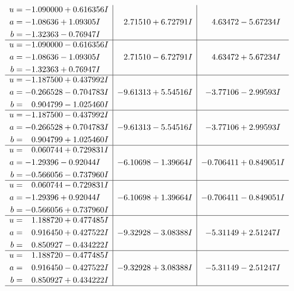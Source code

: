 \documentclass[1p]{elsarticle_modified}
\theoremstyle{definition}
\begin{document}
$$\begin{array}{c|c|c}
\begin{aligned}
u &= -1.090000 + 0.616356 I \\
a &= -1.08636 + 1.09305 I \\
b &= -1.32363 - 0.76947 I\end{aligned}
 & \phantom{-}2.71510 + 6.72791 I & \phantom{-}4.63472 - 5.67234 I \\ \hline\begin{aligned}
u &= -1.090000 - 0.616356 I \\
a &= -1.08636 - 1.09305 I \\
b &= -1.32363 + 0.76947 I\end{aligned}
 & \phantom{-}2.71510 - 6.72791 I & \phantom{-}4.63472 + 5.67234 I \\ \hline\begin{aligned}
u &= -1.187500 + 0.437992 I \\
a &= -0.266528 - 0.704783 I \\
b &= \phantom{-}0.904799 - 1.025460 I\end{aligned}
 & -9.61313 + 5.54516 I & -3.77106 - 2.99593 I \\ \hline\begin{aligned}
u &= -1.187500 - 0.437992 I \\
a &= -0.266528 + 0.704783 I \\
b &= \phantom{-}0.904799 + 1.025460 I\end{aligned}
 & -9.61313 - 5.54516 I & -3.77106 + 2.99593 I \\ \hline\begin{aligned}
u &= \phantom{-}0.060744 + 0.729831 I \\
a &= -1.29396 - 0.92044 I \\
b &= -0.566056 - 0.737960 I\end{aligned}
 & -6.10698 - 1.39664 I & -0.706411 + 0.849051 I \\ \hline\begin{aligned}
u &= \phantom{-}0.060744 - 0.729831 I \\
a &= -1.29396 + 0.92044 I \\
b &= -0.566056 + 0.737960 I\end{aligned}
 & -6.10698 + 1.39664 I & -0.706411 - 0.849051 I \\ \hline\begin{aligned}
u &= \phantom{-}1.188720 + 0.477485 I \\
a &= \phantom{-}0.916450 + 0.427522 I \\
b &= \phantom{-}0.850927 - 0.434222 I\end{aligned}
 & -9.32928 - 3.08388 I & -5.31149 + 2.51247 I \\ \hline\begin{aligned}
u &= \phantom{-}1.188720 - 0.477485 I \\
a &= \phantom{-}0.916450 - 0.427522 I \\
b &= \phantom{-}0.850927 + 0.434222 I\end{aligned}
 & -9.32928 + 3.08388 I & -5.31149 - 2.51247 I\\
 \hline 
 \end{array}$$\newpage
\end{document}
